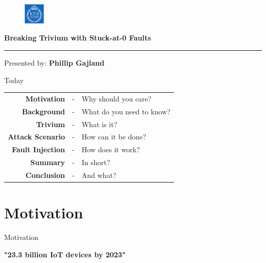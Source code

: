 \documentclass[10pt, compress]{beamer}
\begin{document}
\begin{frame}[plain,t]
\begin{figure}
\begin{flushright}
\vspace{-2cm}
\includegraphics[width = 10mm]{figures/kth_logo.png}
\end{flushright}
\end{figure}

\vspace{2cm}

{\large\textbf{Breaking Trivium with Stuck-at-0 Faults}}
\\\rule{7.5cm}{1pt}

\vspace{0.5cm}

{\large Presented by: \textbf{Phillip Gajland}}

\begin{figure}

\end{figure}
\end{frame}

\begin{frame}{Today}
\begin{table}
\def\arraystretch{1.2}
\raggedright
\begin{tabular}{r c l}
\textbf{Motivation} &-& Why should you care?\\
\textbf{Background} &-& What do you need to know?\\
\textbf{Trivium} &-& What is it?\\
\textbf{Attack Scenario} &-& How can it be done?\\
\textbf{Fault Injection} &-& How does it work?\\
\textbf{Summary} &-& In short?\\
\textbf{Conclusion} &-& And what?
\end{tabular}
\end{table}
\end{frame}

\section{Motivation}

\begin{frame}{Motivation}
\vspace{1cm}
\begin{center}
\centering
{\LARGE\textbf{"23.3 billion IoT devices by 2023"}}\cite{iot}
\end{center}
\end{frame}
\end{document}
